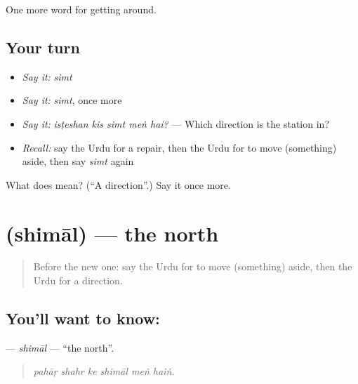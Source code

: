 \begin{grammarlens}[title={What you've built}]
One more word for getting around.
\end{grammarlens}

\subsection*{Your turn}
\begin{itemize}
\raggedright
  \item \emph{Say it:} \emph{simt}
  \item \emph{Say it:} \emph{simt}, once more
  \item \emph{Say it:} \emph{isṭeshan kis simt meṅ hai?} — Which direction is the station in?
  \item \emph{Recall:} say the Urdu for a repair, then the Urdu for to move (something) aside, then say \emph{simt} again
\end{itemize}

\begin{tcolorbox}[breakable,colback=teal!4,colframe=teal!35!black,title={Before you move on}]
What does  mean? (\textquotedblleft{}A direction\textquotedblright{}.) Say it once more.
\end{tcolorbox}
\section[\texorpdfstring{\ur{شمال} (shimāl)}{شمال (shimāl)}]{ (shimāl) — the north}

\label{lesson:UR-C408-shimal}



\begin{quote}
Before the new one: say the Urdu for to move (something) aside, then the Urdu for a direction.
\end{quote}

\subsection*{You'll want to know: }
\textbf{} — \emph{shimāl} — \textquotedblleft{}the north\textquotedblright{}.

\begin{quote}
     
\end{quote}

\begin{quote}
\emph{pahāṛ shahr ke shimāl meṅ haiṅ.}
\end{quote}

